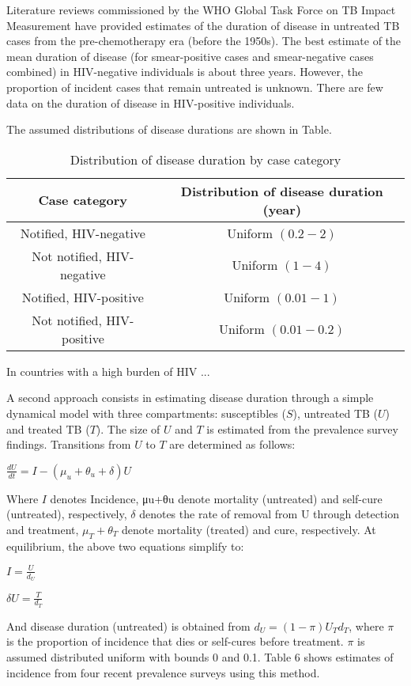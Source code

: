 \begin{enumerate}
Literature reviews commissioned by the WHO Global Task Force on TB Impact Measurement have provided estimates of the duration of disease in untreated TB cases from the pre-chemotherapy era (before the 1950s). The best estimate of the mean duration of disease (for smear-positive cases and smear-negative cases combined) in HIV-negative individuals is about three years. However, the proportion of incident cases that remain untreated is unknown. There are few data on the duration of disease in HIV-positive individuals. 

The assumed distributions of disease durations are shown in Table.

\begin{table} 
    \begin{tabular}{ c c }
        \hline
        Case category & Distribution of disease duration (year) \\ 
        \hline
        Notified, HIV-negative & Uniform $(0.2 - 2)$ \\ 
        Not notified, HIV-negative & Uniform $(1 - 4)$ \\ 
        Notified, HIV-positive & Uniform $(0.01 - 1)$ \\ 
        Not notified, HIV-positive & Uniform $(0.01 - 0.2)$ \\ 
        \hline
    \end{tabular} 
    \caption{Distribution of disease duration by case category} 
\end{table}

In countries with a high burden of HIV ...


A second approach consists in estimating disease duration through a simple dynamical model with three compartments: susceptibles ($S$), untreated TB ($U$) and treated TB ($T$). The size of $U$ and $T$ is estimated from the prevalence survey findings. Transitions from $U$ to $T$ are determined as follows:

$\frac{dU}{dt} = I - (\mu_u + \theta_u + \delta)U$

Where $I$ denotes Incidence, μu+θu denote mortality (untreated) and self-cure (untreated), respectively, $\delta$ denotes the rate of removal from U through detection and treatment, $\mu_T + \theta_T$ denote mortality (treated) and cure, respectively. At equilibrium, the above two equations simplify to: 

$I = \frac{U}{d_U}$

$\delta U = \frac{T}{d_T}$

And disease duration (untreated) is obtained from $d_U=(1-\pi)U_T d_T$, where $\pi$ is the proportion of incidence that dies or self-cures before treatment. $\pi$ is assumed distributed uniform with bounds 0 and 0.1. Table 6 shows estimates of incidence from four recent prevalence surveys using this method. 


\end{enumerate}

